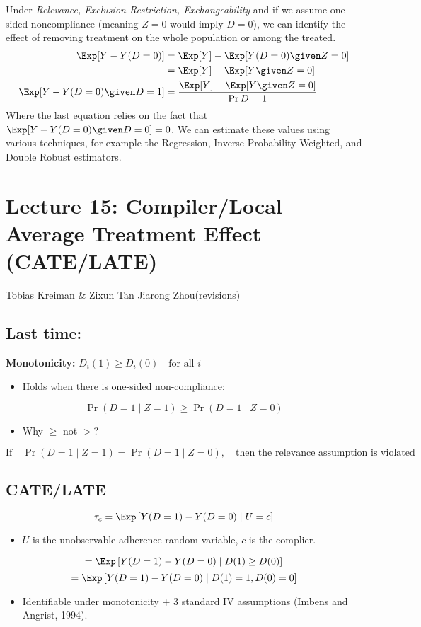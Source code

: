 Under \textit{Relevance, Exclusion Restriction, Exchangeability} and if we assume one-sided noncompliance (meaning \(Z = 0\) would imply \(D = 0\)), we can identify the effect of removing treatment on the whole population or among the treated.
\begin{align*}
    \Exp[Y - Y(D = 0)] &= \Exp[Y] - \Exp[Y(D = 0) \given Z = 0]\\
    &= \Exp[Y] - \Exp[Y \given Z = 0] \\
    \Exp[Y - Y(D = 0) \given D = 1] &= \frac{\Exp[Y] - \Exp[Y \given Z = 0]}{\Pr{D = 1}}
\end{align*}
Where the last equation relies on the fact that \(\Exp[Y - Y(D = 0) \given D = 0] = 0\). We can estimate these values using various techniques, for example the Regression, Inverse Probability Weighted, and Double Robust estimators.

\section{Lecture 15: Compiler/Local Average Treatment Effect (CATE/LATE) }{Tobias Kreiman \& 
Zixun Tan Jiarong Zhou(revisions)}

\subsection{Last time:}
\textbf{Monotonicity:} \(D_i(1) \geq D_i(0) \quad \text{for all } i\)
\begin{itemize}
    \item Holds when there is one-sided non-compliance:
\end{itemize}
\[
\Pr(D = 1 \mid Z = 1) \geq \Pr(D = 1 \mid Z = 0)
\]
\begin{itemize}
    \item Why \(\geq\) not \(>\)?
\end{itemize}
\[
\text{If} \quad \Pr(D = 1 \mid Z = 1) = \Pr(D = 1 \mid Z = 0), \quad \text{then the relevance assumption is violated}
\]

\subsection{CATE/LATE}
\[
\tau_c = \Exp\left[ Y(D = 1) - Y(D = 0) \mid U = c \right]
\]
\begin{itemize}
    \item \(U\) is the unobservable adherence random variable, \(c\) is the complier.
\end{itemize}
\[
= \Exp\left[ Y(D = 1) - Y(D = 0) \mid D(1) \geq D(0) \right]
\]
\[
= \Exp\left[ Y(D = 1) - Y(D = 0) \mid D(1) = 1, D(0) = 0 \right]
\]
\begin{itemize}
    \item Identifiable under monotonicity + 3 standard IV assumptions (Imbens and Angrist, 1994).
\end{itemize}

